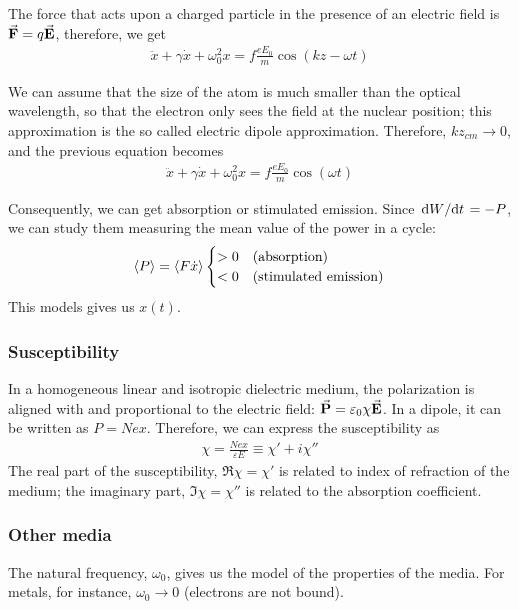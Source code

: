 The force that acts upon a charged particle in the presence of an electric field is $\va{F} = q \va{E}$, therefore, we get
\begin{align*}
	\ddot{x} + \gamma \dot{x} + \omega_{0}^{2}x = f \frac{e E_{0}}{m} \cos(kz - \omega t)
\end{align*}

We can assume that the size of the atom is much smaller than the optical wavelength, so that the electron only sees the field at the nuclear position; this approximation is the so called electric dipole approximation. Therefore, $k z_{cm} \to 0$, and the previous equation becomes
\begin{align}
	\ddot{x} + \gamma \dot{x} + \omega_{0}^{2}x = f \frac{e E_{0}}{m} \cos(\omega t)
\end{align}

Consequently, we can get absorption or stimulated emission. Since $\dv*{W}{t} = - P$, we can study them measuring the mean value of the power in a cycle:
\begin{align}
	\ev{P} = \ev{F \dot{x}}
	\begin{cases}
		>0 & \text{(absorption)} \\
		<0 & \text{(stimulated emission)}
	\end{cases}
\end{align}
This models gives us $x(t)$.

\subsubsection*{Susceptibility}
In a homogeneous linear and isotropic dielectric medium, the polarization is aligned with and proportional to the electric field: $\va{P} = \varepsilon_{0} \chi \va{E}$. In a dipole, it can be written as $P = N e x$. Therefore, we can express the susceptibility as
\begin{align}
	\chi = \frac{N e x}{\varepsilon E} \equiv \chi' + i \chi''
\end{align}
The real part of the susceptibility, $\Re{\chi} = \chi'$ is related to index of refraction of the medium; the imaginary part, $\Im{\chi} = \chi''$ is related to the absorption coefficient.

\subsubsection*{Other media}
The natural frequency, $\omega_{0}$, gives us the model of the properties of the media. For metals, for instance, $\omega_{0} \to 0$ (electrons are not bound).

